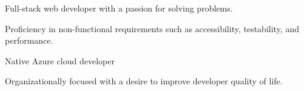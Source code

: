 

\begin{cventries}

  \cventry
    {} %
    {} %
    {} %
    {} %
    {
      \begin{cvitemscust} %
        \item {Full-stack web developer with a passion for solving problems.}
        \item {Proficiency in non-functional requirements such as accessibility, testability, and performance.}
        \item {Native Azure cloud developer}
        \item {Organizationally focused with a desire to improve developer quality of life.}
      \end{cvitemscust}
    }
\end{cventries}
